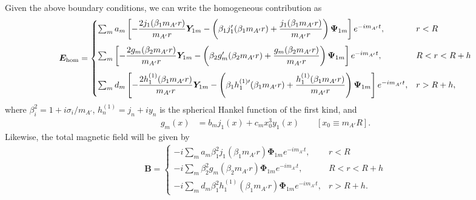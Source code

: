 \documentclass[amsmath,amssymb,aps,10pt,prd,letterpaper,nofootinbib,balancelastpage,notitlepage,superscriptaddress,twocolumn,floatfix]{revtex4-2}
\newcommand{\lb}{\ensuremath{\left}}					%
\newcommand{\rb}{\ensuremath{\right}}					%
\begin{document}
\begin{widetext}
Given the above boundary conditions, we can write the homogeneous contribution as
\begin{align}
    \bm{E}_\text{hom}=
    \begin{cases}
        \sum_ma_m\lb[
        -\dfrac{2j_1(\beta_1m_{A'}r)}{m_{A'}r}\bm{Y}_{1m}
        -\lb(\beta_1j'_1(\beta_1m_{A'}r)+\dfrac{j_1(\beta_1m_{A'}r)}{m_{A'}r}\rb)\bm{\Psi}_{1m}\rb]
        e^{-im_{A'}t},  &   r<R \\[3ex]
        \sum_m\lb[
        -\dfrac{2g_m(\beta_2m_{A'}r)}{m_{A'}r}\bm{Y}_{1m}
        -\lb(\beta_2g'_m(\beta_2m_{A'}r)+\dfrac{g_m(\beta_2m_{A'}r)}{m_{A'}r}\rb)\bm{\Psi}_{1m}\rb]
        e^{-im_{A'}t},  &   R<r<R+h \\[3ex]
        \sum_md_m\lb[
        -\dfrac{2h^{(1)}_1(\beta_1m_{A'}r)}{m_{A'}r}\bm{Y}_{1m}
        -\lb(\beta_1h^{(1)\prime}_1(\beta_1m_{A'}r)+\dfrac{h^{(1)}_1(\beta_1m_{A'}r)}{m_{A'}r}\rb)\bm{\Psi}_{1m}\rb]
        e^{-im_{A'}t},  &   r>R+h, 
    \end{cases}
     \label{eq:Efinite}
\end{align}
where $\beta^2_i=1+i\sigma_i/m_{A'}$, $h^{(1)}_n = j_n + i y_n$ is the spherical Hankel function of the first kind, and
\begin{align}
    g_{m}(x)&=b_mj_1(x)+c_m x_0^3 y_1(x) \qquad
    [x_0 \equiv m_{A'}R].
\end{align}
Likewise, the total magnetic field will be given by 
\begin{align}
    \bm{B}=
    \begin{cases}
        -i\sum_ma_m\beta_1^2j_1(\beta_1m_{A'}r)\bm{\Phi}_{1m}
        e^{-im_{A'}t},  &   r<R \\[3ex]
        -i\sum_m\beta_2^2g_m(\beta_2m_{A'}r)\bm{\Phi}_{1m}
        e^{-im_{A'}t},  &   R<r<R+h  \\[3ex]
        -i\sum_md_m\beta_1^2h_1^{(1)}(\beta_1m_{A'}r)\bm{\Phi}_{1m}
        e^{-im_{A'}t},  &   r>R+h.
    \end{cases}
     \label{eq:Bfinite} 
\end{align}


\end{widetext}
\end{document}
